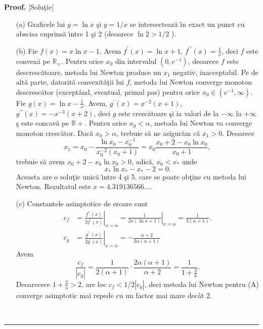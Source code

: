 \documentclass[a4paper]{article}%
\newenvironment{proof}[1][Proof]{\noindent\textbf{#1.} }{\ \rule{0.5em}{0.5em}}
\begin{document}
\begin{proof}
[Solu\c{t}ie]

\begin{enumerate}
\item[(a)] Graficele lui $y=\ln x$ \c{s}i  $y=1/x$ se intersecteaz\u{a}
\^{\i}n exact un punct cu abscisa cuprins\u{a} \^{\i}ntre 1 \c{s}i 2 (deoarece
$\ln2>1/2$ ).

\item[(b)] Fie $f(x)=x\ln x-1$. Avem $f^{\prime}(x)=\ln x+1$, $f^{\prime
\prime}(x)=\frac{1}{x}$, deci $f$ este convex\u{a} pe $\mathbb{R}_{+}$. Pentru
orice $x_{0}$ din intervalul $(0,e^{-1})$, deoarece $f$ este
descresc\u{a}toare, metoda lui Newton produce un $x_{1}$ negativ,
inacceptabil. Pe de alt\u{a} parte, datorit\u{a} convexit\u{a}\c{t}ii lui
$f$, metoda lui Newton converge monoton descresc\u{a}tor (except\^{a}nd,
eventual, primul pas) pentru orice $x_{0}\in(e^{-1},\infty)$. Fie $g(x)=\ln
x-\frac{1}{x}$. Avem, $g^{\prime}(x)=x^{-2}(x+1)$, $g^{\prime\prime
}(x)=-x^{-3}(x+2)$, deci $g$ este cresc\u{a}toare \c{s}i ia valori de la
$-\infty$ la $+\infty$ \c{s} este concav\u{a} pe $\mathbb{R}+$. Pentru orice
$x_{0}<\alpha$, metoda lui Newton va converge monoton cresc\u{a}tor. Dac\u{a}
$x_{0}>\alpha$, trebuie s\u{a} ne asigur\u{a}m c\u{a}  $x_{1}>0$. Deoarece%
\[
x_{1}=x_{0}-\frac{\ln x_{0}-x_{0}^{-1}}{x_{0}^{-2}(x_{0}+1)}=x_{0}\frac
{x_{0}+2-x_{0}\ln x_{0}}{x_{0}+1},
\]
trebuie s\u{a} avem $x_{0}+2-x_{0}\ln x_{0}>0$, adic\u{a}, $x_{0}<x_{\ast}$
unde
\[
x_{\ast}\ln x_{\ast}-x_{\ast}-2=0.
\]
Aceasta are o solu\c{t}ie unic\u{a} \^{\i}ntre  4 \c{s}i 5, care se poate
ob\c{t}ine cu metoda lui Newton. Rezultatul este  $x=4.319136566\dots.$

\item[(c)] Constantele asimptotice de eroare sunt%
\begin{align*}
c_{f} &  =\left.  \frac{f^{\prime\prime}(x)}{2f^{\prime}(x)}\right\vert
_{x=\alpha}=\left.  \frac{1}{2x\left(  \ln x+1\right)  }\right\vert
_{x=\alpha}=\frac{1}{2\left(  \alpha+1\right)  }.\\
c_{g} &  =\left.  \frac{g^{\prime\prime}(x)}{2g^{\prime}(x)}\right\vert
_{x=\alpha}=-\frac{\alpha+2}{2\alpha(\alpha+1)}%
\end{align*}
Avem%
\[
\frac{c_{f}}{\left\vert c_{g}\right\vert }=\frac{1}{2\left(  \alpha+1\right)
}\cdot\frac{2\alpha(\alpha+1)}{\alpha+2}=\frac{1}{1+\frac{2}{a}}.
\]
Deoarecece $1+\frac{2}{a}>2$, are loc $c_{f}<1/2|c_{g}|$, deci metoda lui
Newton pentru (A) converge asimptotic mai repede cu un factor mai mare
dec\^{a}t 2.
\end{enumerate}
\end{proof}
\end{document}

